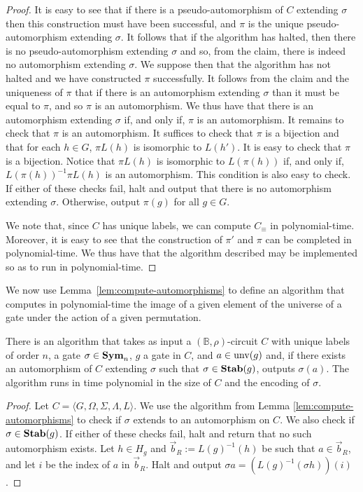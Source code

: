 \documentclass[../main/thesis.tex]{subfiles}
\begin{document}
\begin{proof}
It is easy to see that if there is a pseudo-automorphism of $C$ extending
$\sigma$ then this construction must have been successful, and $\pi$ is the
unique pseudo-automorphism extending $\sigma$. It follows that if the algorithm
has halted, then there is no pseudo-automorphism extending $\sigma$ and so, from
the claim, there is indeed no automorphism extending $\sigma$. We suppose then
that the algorithm has not halted and we have constructed $\pi$ successfully. It
follows from the claim and the uniqueness of $\pi$ that if there is an
automorphism extending $\sigma$ than it must be equal to $\pi$, and so $\pi$ is
an automorphism. We thus have that there is an automorphism extending $\sigma$
if, and only if, $\pi$ is an automorphism. It remains to check that $\pi$ is an
automorphism. It suffices to check that $\pi$ is a bijection and that for each
$h \in G$, $\pi L(h)$ is isomorphic to $L(h')$. It is easy to check that $\pi$
is a bijection. Notice that $\pi L(h)$ is isomorphic to $L(\pi(h))$ if, and only
if, $L(\pi(h))^{-1}\pi L(h)$ is an automorphism. This condition is also easy to
check. If either of these checks fail, halt and output that there is no
automorphism extending $\sigma$. Otherwise, output $\pi (g)$ for all $g \in G$.

We note that, since $C$ has unique labels, we can compute $C_\equiv$ in
polynomial-time. Moreover, it is easy to see that the construction of $\pi'$ and
$\pi$ can be completed in polynomial-time. We thus have that the algorithm
described may be implemented so as to run in polynomial-time.
\end{proof}

We now use Lemma~\ref{lem:compute-automorphisms} to define an algorithm that
computes in polynomial-time the image of a given element of the universe of a
gate under the action of a given permutation.

\begin{lem}
  There is an algorithm that takes as input a $(\mathbb{B}, \rho)$-circuit $C$
  with unique labels of order $n$, a gate $\sigma \in \text{\textbf{Sym}}_n$, $g$ a gate in
  $C$, and $a \in \text{unv}(g)$ and, if there exists an automorphism of $C$
  extending $\sigma$ such that $\sigma \in \text{\textbf{Stab}}(g)$, outputs $\sigma(a)$. The
  algorithm runs in time polynomial in the size of $C$ and the encoding of
  $\sigma$.
  \label{lem:compute-automorphisms-labels}
\end{lem}
\begin{proof}
  Let $C = \langle G, \Omega, \Sigma, \Lambda, L \rangle$. We use the algorithm
  from Lemma \ref{lem:compute-automorphisms} to check if $\sigma$ extends to an
  automorphism on $C$. We also check if $\sigma \in \text{\textbf{Stab}}(g)$. If either of
  these checks fail, halt and return that no such automorphism exists. Let $h
  \in H_g$ and $\vec{b}_R := L(g)^{-1}(h)$ be such that $a \in \vec{b}_R$, and
  let $i$ be the index of $a$ in $\vec{b}_R$. Halt and output $\sigma a =
  (L(g)^{-1}(\sigma h))(i)$.
\end{proof}
\end{document}
